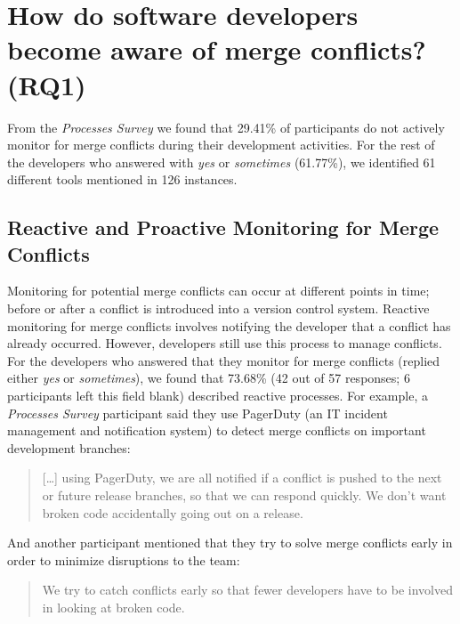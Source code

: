 
\section{How do software developers become \textbf{aware} of merge conflicts? (RQ1)}\label{RQ1}

From the \textit{Processes Survey} we found that 29.41\% of participants do not actively monitor for merge conflicts during their development activities.
For the rest of the developers who answered with \emph{yes} or \emph{sometimes} (61.77\%), we identified 61 different tools mentioned in 126 instances.

\subsection{Reactive and Proactive Monitoring for Merge Conflicts}

Monitoring for potential merge conflicts can occur at different points in time; before or after a conflict is introduced into a version control system.
Reactive monitoring for merge conflicts involves notifying the developer that a conflict has already occurred.
However, developers still use this process to manage conflicts.
For the developers who answered that they monitor for merge conflicts (replied either \emph{yes} or \emph{sometimes}), we found that 73.68\% (42 out of 57 responses; 6 participants left this field blank) described reactive processes.
For example, a \textit{Processes Survey} participant said they use PagerDuty (an IT incident management and notification system) to detect merge conflicts on important development branches:
\begin{quotation}
	[\ldots] using PagerDuty, we are all notified if a conflict is pushed to the next or future release branches, so that we can respond quickly. We don't want broken code accidentally going out on a release.
\end{quotation}
And another participant mentioned that they try to solve merge conflicts early in order to minimize disruptions to the team:
\begin{quotation}
	We try to catch conflicts early so that fewer developers have to be involved in looking at broken code.
\end{quotation}

